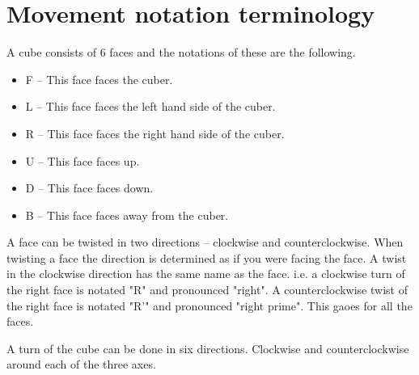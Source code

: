 \section{Movement notation terminology}
A cube consists of 6 faces and the notations of these are the following.
\begin{itemize}
\label{move_notation}
\item {} F -- This face faces the cuber.
\item {} L -- This face faces the left hand side of the cuber.
\item {} R -- This face faces the right hand side of the cuber.
\item {} U -- This face faces up.
\item {} D -- This face faces down.
\item {} B -- This face faces away from the cuber.
\end{itemize} 

A face can be twisted in two directions -- clockwise and counterclockwise. When twisting a face the direction is determined as if you were facing the face.
A twist in the clockwise direction has the same name as the face. i.e. a clockwise turn of the right face is notated "R" and pronounced "right". A counterclockwise twist of the right face is notated "R'" and pronounced "right prime". This gaoes for all the faces.

A turn of the cube can be done in six directions. Clockwise and counterclockwise around each of the three axes.




